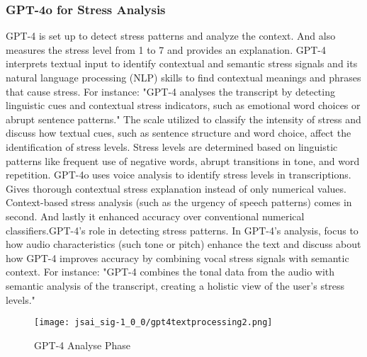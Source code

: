 \documentclass[a4j, twocolumn]{article}
\begin{document}
\vspace{10pt} %
   \subsubsection{GPT-4o for Stress Analysis}
GPT-4 is set up to detect stress patterns and analyze the context. And also measures the stress level from 1 to 7 and provides an explanation. GPT-4 interprets textual input to identify contextual and semantic stress signals and its natural language processing (NLP) skills to find contextual meanings and phrases that cause stress. 
For instance: "GPT-4 analyses the transcript by detecting linguistic cues and contextual stress indicators, such as emotional word choices or abrupt sentence patterns." The scale utilized to classify the intensity of stress and discuss how textual cues, such as sentence structure and word choice, affect the identification of stress levels.
Stress levels are determined based on linguistic patterns like frequent use of negative words, abrupt transitions in tone, and word repetition. GPT-4o uses voice analysis to identify stress levels in transcriptions. Gives thorough contextual stress explanation instead of only numerical values. Context-based stress analysis (such as the urgency of speech patterns) comes in second. And lastly it enhanced accuracy over conventional numerical classifiers.GPT-4's role in detecting stress patterns.
In GPT-4's analysis, focus to how audio characteristics (such tone or pitch) enhance the text and discuss about how GPT-4 improves accuracy by combining vocal stress signals with semantic context. 
For instance: "GPT-4 combines the tonal data from the audio with semantic analysis of the transcript, creating a holistic view of the user's stress levels." 
\vspace{10pt} %
\begin{figure}[htbp] %
\centering
\texttt{[image: jsai\_sig-1\_0\_0/gpt4textprocessing2.png]} %
\caption{GPT-4 Analyse Phase}
\label{fig:system_architecture}
\end{figure}
\vspace{10pt} %
\end{document}
